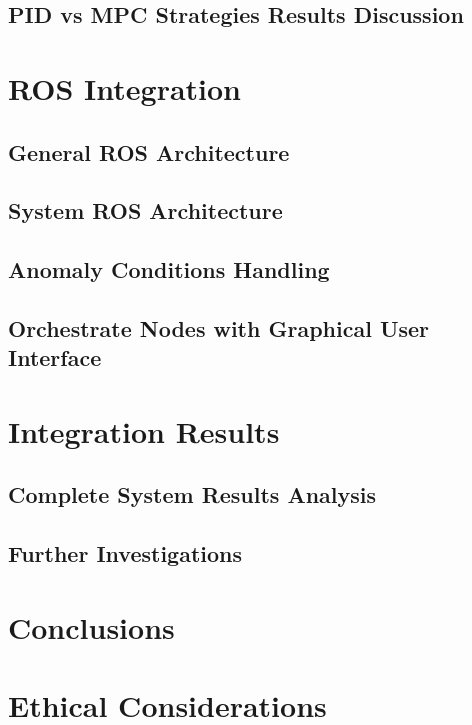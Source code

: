 \documentclass[11pt]{report} %
\begin{document}
\section{PID vs MPC Strategies Results Discussion}

\chapter{ROS Integration}

\section{General ROS Architecture}

\section{System ROS Architecture}

\section{Anomaly Conditions Handling}

\section{Orchestrate Nodes with Graphical User Interface}

\chapter{Integration Results}

\section{Complete System Results Analysis}

\section{Further Investigations}

\chapter{Conclusions}

\chapter{Ethical Considerations}



\begin{sloppypar}
    
    
\end{sloppypar}
\end{document}
